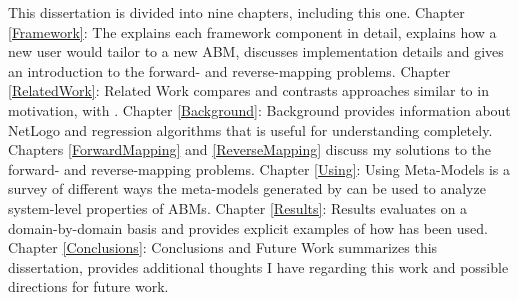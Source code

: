 This dissertation is divided into nine chapters, including this one.
Chapter \ref{Framework}: The \framework explains each framework component in detail, explains how a new user would tailor \fw to a new ABM, discusses implementation details and gives an introduction to the forward- and reverse-mapping problems.
Chapter \ref{RelatedWork}: Related Work compares and contrasts approaches similar to \fw in motivation, with \fw.
Chapter \ref{Background}: Background provides information about NetLogo and regression algorithms that is useful for understanding \fw completely.
Chapters \ref{ForwardMapping} and \ref{ReverseMapping} discuss my solutions to the forward- and reverse-mapping problems.
Chapter \ref{Using}: Using Meta-Models is a survey of different ways the meta-models generated by \fw can be used to analyze system-level properties of ABMs.
Chapter \ref{Results}: Results evaluates \fw on a domain-by-domain basis and provides explicit examples of how \fw has been used.
Chapter \ref{Conclusions}: Conclusions and Future Work summarizes this dissertation, provides additional thoughts I have regarding this work and possible directions for future work.


 





